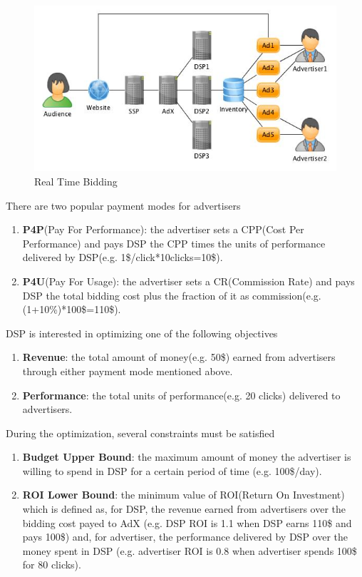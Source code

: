\documentclass[sigconf]{acmart}
\begin{document}
\begin{figure}[!h]
\centering
\includegraphics[width=1.0\linewidth]{./DSP.jpg}
\caption{Real Time Bidding}
\end{figure}

There are two popular payment modes for advertisers
\begin{enumerate}
\item \textbf{P4P}(Pay For Performance): the advertiser sets a CPP(Cost Per Performance)
    and pays DSP the CPP times the units of performance delivered by DSP(e.g. 1\$/click*10clicks=10\$).
\item \textbf{P4U}(Pay For Usage): the advertiser sets a CR(Commission Rate)
    and pays DSP the total bidding cost plus the fraction of it as commission(e.g. (1+10\%)*100\$=110\$).
\end{enumerate}

DSP is interested in optimizing one of the following objectives
\begin{enumerate}
\item \textbf{Revenue}: the total amount of money(e.g. 50\$) earned from advertisers through either payment mode mentioned above.
\item \textbf{Performance}: the total units of performance(e.g. 20 clicks) delivered to advertisers.
\end{enumerate}

During the optimization, several constraints must be satisfied
\begin{enumerate}
\item \textbf{Budget Upper Bound}: the maximum amount of money the advertiser is willing to spend in DSP for a certain period of time
  (e.g. 100\$/day).
\item \textbf{ROI Lower Bound}: the minimum value of ROI(Return On Investment) which is defined as,
  for DSP, the revenue earned from advertisers over the bidding cost payed to AdX
  (e.g. DSP ROI is 1.1 when DSP earns 110\$ and pays 100\$) and,
  for advertiser, the performance delivered by DSP over the money spent in DSP
  (e.g. advertiser ROI is 0.8 when advertiser spends 100\$ for 80 clicks).
\end{enumerate}
\end{document}
